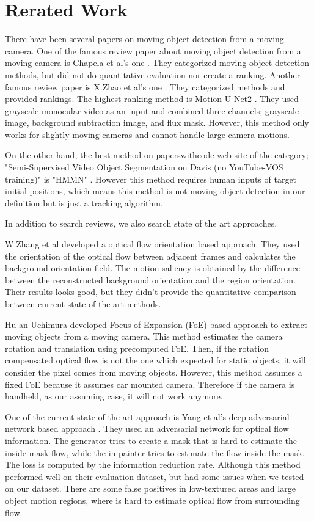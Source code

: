 \documentclass[10pt, twocolumn]{article}
\begin{document}
\section{Rerated Work}
There have been several papers on moving object detection from a moving camera.
One of the famous review paper about moving object detection from a moving camera is Chapela et al's one \cite{chapel2020moving}.
They categorized moving object detection methods, but did not do quantitative evaluation nor create a ranking.
Another famous review paper is X.Zhao et al's one \cite{ZHAO202228}.
They categorized methods and provided rankings.
The highest-ranking method is Motion U-Net2 \cite{DBLP:conf/icpr/RahmonBSP20}.
They used grayscale monocular video as an input and combined three channels; grayscale image, background subtraction image, and flux mask.
However, this method only works for slightly moving cameras and cannot handle large camera motions.

On the other hand, the best method on paperswithcode web site of the category; "Semi-Supervised Video Object Segmentation on Davis (no YouTube-VOS training)" is "HMMN" \cite{DBLP:journals/corr/abs-2109-11404}.
However this method requires human inputs of target initial positions, which means this method is not moving object detection in our definition but is just a tracking algorithm.

In addition to search reviews, we also search state of the art approaches.

W.Zhang et al \cite{Zhang_Sun_Yu_2020} developed a optical flow orientation based approach.
They used the orientation of the optical flow between adjacent frames and calculates the background orientation field.
The motion saliency is obtained by the difference between the reconstructed background orientation and the region orientation.
Their results looks good, but they didn't provide the quantitative comparison between current state of the art methods.

Hu an Uchimura \cite{hu2000} developed Focus of Expansion (FoE) based approach to extract moving objects from a moving camera.
This method estimates the camera rotation and translation using precomputed FoE.
Then, if the rotation compensated optical flow is not the one which expected for static objects, it will consider the pixel comes from moving objects.
However, this method assumes a fixed FoE because it assumes car mounted camera.
Therefore if the camera is handheld, as our assuming case, it will not work anymore.

One of the current state-of-the-art approach is Yang et al's deep adversarial network based approach \cite{yang_loquercio_2019}.
They used an adversarial network for optical flow information.
The generator tries to create a mask that is hard to estimate the inside mask flow, while the in-painter tries to estimate the flow inside the mask.
The loss is computed by the information reduction rate.
Although this method performed well on their evaluation dataset, but had some issues when we tested on our dataset.
There are some false positives in low-textured areas and large object motion regions, where is hard to estimate optical flow from surrounding flow.
\end{document}
